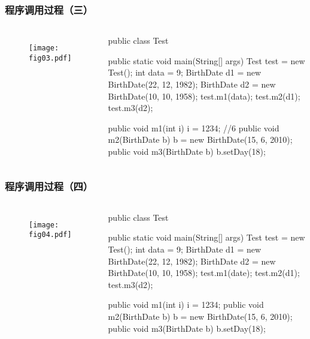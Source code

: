 \begin{frame}[fragile] %
\frametitle{程序调用过程（三）}

\begin{columns}
\begin{figure}
\centering
\texttt{[image: fig03.pdf]}
\end{figure}

\begin{javaCode}\small
public class Test {
  public static void main(String[] args) {
    Test test = new Test(); 
    int data = 9; 
    BirthDate d1 = new BirthDate(22, 12, 1982); 
    BirthDate d2 = new BirthDate(10, 10, 1958); 
    test.m1(data); 
    test.m2(d1);
    test.m3(d2);
  }

  public void m1(int i) {
    i = 1234; //6
  }
  public void m2(BirthDate b) {
    b = new BirthDate(15, 6, 2010);
  }
  public void m3(BirthDate b) {
    b.setDay(18);
  }
}
\end{javaCode}
\end{columns}
\end{frame}



\begin{frame}[fragile] %
\frametitle{程序调用过程（四）}

\begin{columns}
\begin{figure}
\centering
\texttt{[image: fig04.pdf]}
\end{figure}

\begin{javaCode}\small
public class Test {
  public static void main(String[] args) {
    Test test = new Test(); 
    int data = 9; 
    BirthDate d1 = new BirthDate(22, 12, 1982); 
    BirthDate d2 = new BirthDate(10, 10, 1958); 
    test.m1(date); 
    test.m2(d1); 
    test.m3(d2);
  }

  public void m1(int i) {
    i = 1234; 
  }
  public void m2(BirthDate b) {
    b = new BirthDate(15, 6, 2010);
  }
  public void m3(BirthDate b) {
    b.setDay(18);
  }
}
\end{javaCode}
\end{columns}
\end{frame}



